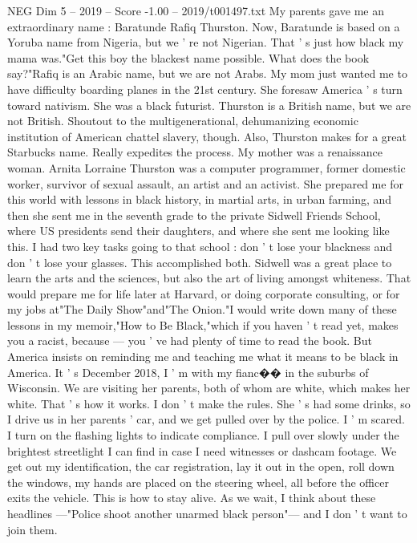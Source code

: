 \begin{textsample}{NEG Dim 5 – 2019 – Score -1.00 – 2019/t001497.txt}  \label{ex:f5_neg_004}
My parents gave me an extraordinary name : Baratunde Rafiq Thurston.
Now, Baratunde is based on a Yoruba name from Nigeria, but we ' re not Nigerian.
That ' s just how black my mama was."Get this boy the blackest name possible.
What does the book say?"Rafiq is an Arabic name, but we are not Arabs.
My mom just wanted me to have difficulty boarding planes in the 21st century.
She foresaw America ' s turn toward nativism.
She was a black futurist.
Thurston is a British name, but we are not British.
Shoutout to the multigenerational, dehumanizing economic institution of American chattel slavery, though.
Also, Thurston makes for a great Starbucks name.
Really expedites the process.
My mother was a renaissance woman.
Arnita Lorraine Thurston was a computer programmer, former domestic worker, survivor of sexual assault, an artist and an activist.
She prepared me for this world with lessons in black history, in martial arts, in urban farming, and then she sent me in the seventh grade to the private Sidwell Friends School, where US presidents send their daughters, and where she sent me looking like this.
I had two key tasks going to that school : don ' t lose your blackness and don ' t lose your glasses.
This accomplished both.
Sidwell was a great place to learn the arts and the sciences, but also the art of living amongst whiteness.
That would prepare me for life later at Harvard, or doing corporate consulting, or for my jobs at"The Daily Show"and"The Onion."I would write down many of these lessons in my memoir,"How to Be Black,"which if you haven ' t read yet, makes you a racist, because — you ' ve had plenty of time to read the book.
But America insists on reminding me and teaching me what it means to be black in America.
It ' s December 2018, I ' m with my fianc{\EmojiFont �}{\EmojiFont �} in the suburbs of Wisconsin.
We are visiting her parents, both of whom are white, which makes her white.
That ' s how it works.
I don ' t make the rules.
She ' s had some drinks, so I drive us in her parents ' car, and we get pulled over by the police.
I ' m scared.
I turn on the flashing lights to indicate compliance.
I pull over slowly under the brightest streetlight I can find in case I need witnesses or dashcam footage.
We get out my identification, the car registration, lay it out in the open, roll down the windows, my hands are placed on the steering wheel, all before the officer exits the vehicle.
This is how to stay alive.
As we wait, I think about these headlines —"Police shoot another unarmed black person"— and I don ' t want to join them.

\end{textsample}
